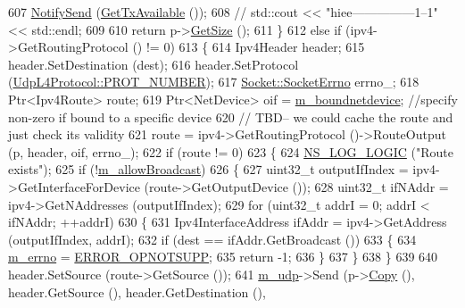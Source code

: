 \begin{DoxyCode}
607       \hyperlink{classns3_1_1Socket_a34cd5de5b9feeadd6ba8973b954c3d5f}{NotifySend} (\hyperlink{classns3_1_1UdpSocketImpl_a70191d0578ae26233f569631a26d608b}{GetTxAvailable} ());
608      \textcolor{comment}{// std::cout << "hiee---------------1--1" << std::endl;}
609 
610       \textcolor{keywordflow}{return} p->\hyperlink{classns3_1_1Packet_a462855c9929954d4301a4edfe55f4f1c}{GetSize} ();
611     \}
612   \textcolor{keywordflow}{else} \textcolor{keywordflow}{if} (ipv4->GetRoutingProtocol () != 0)
613     \{
614       Ipv4Header header;
615       header.SetDestination (dest);
616       header.SetProtocol (\hyperlink{classns3_1_1UdpL4Protocol_ad370801b3d1a166e831020a777c41047}{UdpL4Protocol::PROT\_NUMBER});
617       \hyperlink{classns3_1_1Socket_ada1328c5ae0c28cb2a982caf8f6d6cca}{Socket::SocketErrno} errno\_;
618       Ptr<Ipv4Route> route;
619       Ptr<NetDevice> oif = \hyperlink{classns3_1_1Socket_a9781d8dfdb5e9364d5dce8f53b768bb5}{m\_boundnetdevice}; \textcolor{comment}{//specify non-zero if bound to a specific
       device}
620       \textcolor{comment}{// TBD-- we could cache the route and just check its validity}
621       route = ipv4->GetRoutingProtocol ()->RouteOutput (p, header, oif, errno\_); 
622       \textcolor{keywordflow}{if} (route != 0)
623         \{
624           \hyperlink{group__logging_ga88acd260151caf2db9c0fc84997f45ce}{NS\_LOG\_LOGIC} (\textcolor{stringliteral}{"Route exists"});
625           \textcolor{keywordflow}{if} (!\hyperlink{classns3_1_1UdpSocketImpl_a071404252802565f1d1511b5c98b155a}{m\_allowBroadcast})
626             \{
627               uint32\_t outputIfIndex = ipv4->GetInterfaceForDevice (route->GetOutputDevice ());
628               uint32\_t ifNAddr = ipv4->GetNAddresses (outputIfIndex);
629               \textcolor{keywordflow}{for} (uint32\_t addrI = 0; addrI < ifNAddr; ++addrI)
630                 \{
631                   Ipv4InterfaceAddress ifAddr = ipv4->GetAddress (outputIfIndex, addrI);
632                   \textcolor{keywordflow}{if} (dest == ifAddr.GetBroadcast ())
633                     \{
634                       \hyperlink{classns3_1_1UdpSocketImpl_ac35998e8aa2cc588e21752944b0a0095}{m\_errno} = \hyperlink{classns3_1_1Socket_ada1328c5ae0c28cb2a982caf8f6d6ccaa777b6c9712ef5485ebecfb96d5de4d54}{ERROR\_OPNOTSUPP};
635                       \textcolor{keywordflow}{return} -1;
636                     \}
637                 \}
638             \}
639 
640           header.SetSource (route->GetSource ());
641           \hyperlink{classns3_1_1UdpSocketImpl_ace4b90c1ab6f4f302cdb4cd8da973514}{m\_udp}->Send (p->\hyperlink{classns3_1_1Packet_a5d5c70802a5f77fc5f0001e0cfc1898b}{Copy} (), header.GetSource (), header.GetDestination (),

\end{DoxyCode}
